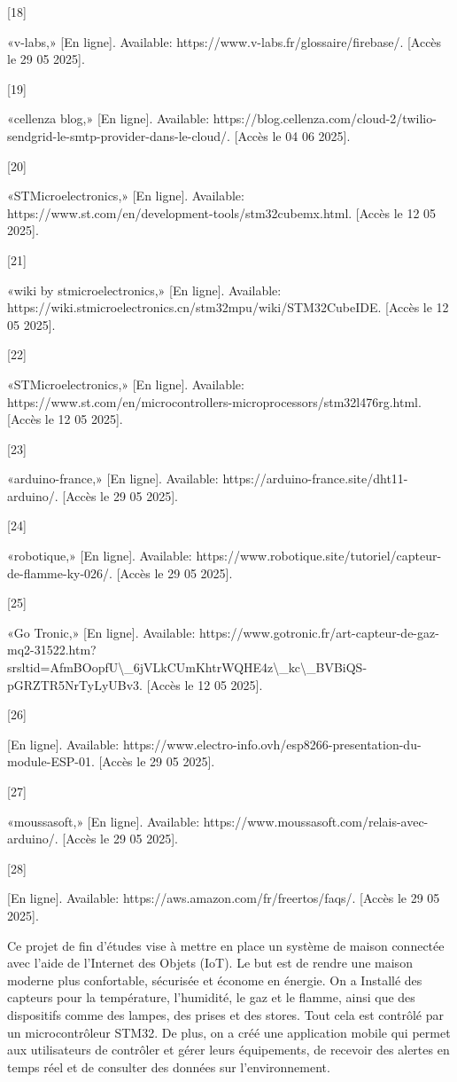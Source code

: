\documentclass{article}
\begin{document}
[18] 

«v-labs,» [En ligne]. Available: https://www.v-labs.fr/glossaire/firebase/. [Accès le 29 05 2025].

[19] 

«cellenza blog,» [En ligne]. Available: https://blog.cellenza.com/cloud-2/twilio-sendgrid-le-smtp-provider-dans-le-cloud/. [Accès le 04 06 2025].

[20] 

«STMicroelectronics,» [En ligne]. Available: https://www.st.com/en/development-tools/stm32cubemx.html. [Accès le 12 05 2025].

[21] 

«wiki by stmicroelectronics,» [En ligne]. Available: https://wiki.stmicroelectronics.cn/stm32mpu/wiki/STM32CubeIDE. [Accès le 12 05 2025].

[22] 

«STMicroelectronics,» [En ligne]. Available: https://www.st.com/en/microcontrollers-microprocessors/stm32l476rg.html. [Accès le 12 05 2025].

[23] 

«arduino-france,» [En ligne]. Available: https://arduino-france.site/dht11-arduino/. [Accès le 29 05 2025].

[24] 

«robotique,» [En ligne]. Available: https://www.robotique.site/tutoriel/capteur-de-flamme-ky-026/. [Accès le 29 05 2025].

[25] 

«Go Tronic,» [En ligne]. Available: https://www.gotronic.fr/art-capteur-de-gaz-mq2-31522.htm?srsltid=AfmBOopfU\textbackslash{}_6jVLkCUmKhtrWQHE4z\textbackslash{}_kc\textbackslash{}_BVBiQS-pGRZTR5NrTyLyUBv3. [Accès le 12 05 2025].

[26] 

[En ligne]. Available: https://www.electro-info.ovh/esp8266-presentation-du-module-ESP-01. [Accès le 29 05 2025].

[27] 

«moussasoft,» [En ligne]. Available: https://www.moussasoft.com/relais-avec-arduino/. [Accès le 29 05 2025].

[28] 

[En ligne]. Available: https://aws.amazon.com/fr/freertos/faqs/. [Accès le 29 05 2025].

Ce projet de fin d'études vise à mettre en place un système de maison connectée avec l'aide de l'Internet des Objets (IoT). Le but est de rendre une maison moderne plus confortable, sécurisée et économe en énergie.  On a Installé des capteurs pour la température, l'humidité, le gaz et le flamme, ainsi que des dispositifs comme des lampes, des prises et des stores. Tout cela est contrôlé par un microcontrôleur STM32. De plus, on a créé une application mobile qui permet aux utilisateurs de contrôler et gérer leurs équipements, de recevoir des alertes en temps réel et de consulter des données sur l'environnement.
\end{document}
